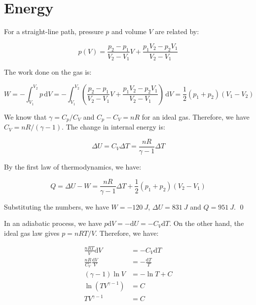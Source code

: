 \documentclass[12pt]{article}
\begin{document}



\pagebreak
\section*{Energy}


For a straight-line path, pressure $p$ and volume $V$ are related by:

\begin{equation}
    p(V) = \frac{p_{2} - p_{1}}{V_{2} - V_{1}} V + \frac{p_{1} V_{2} - p_{2} V_{1}}{V_{2} - V_{1}}
\end{equation}

The work done on the gas is:

\begin{equation}
    W = -\int_{V_{1}}^{V_{2}} p \, \mathrm{d}V = -\int_{V_{1}}^{V_{2}} \left( \frac{p_{2} - p_{1}}{V_{2} - V_{1}} V + \frac{p_{1} V_{2} - p_{2} V_{1}}{V_{2} - V_{1}} \right) \, \mathrm{d}V = \frac{1}{2} (p_{1} + p_{2}) (V_{1} - V_{2})
\end{equation}

We know that $\gamma = C_{p} / C_{V}$ and $C_{p} - C_{V} = nR$ for an ideal gas. Therefore, we have $C_{V} = nR / (\gamma - 1)$. The change in internal energy is:

\begin{equation}
    \Delta U = C_{V} \Delta T = \frac{nR}{\gamma - 1} \Delta T
\end{equation}

By the first law of thermodynamics, we have:

\begin{equation}
    Q = \Delta U - W = \frac{nR}{\gamma - 1} \Delta T + \frac{1}{2} (p_{1} + p_{2}) (V_{2} - V_{1})
\end{equation}

Substituting the numbers, we have $W = \qty{-120}{J}$, $\Delta U = \qty{831}{J}$ and $Q = \qty{951}{J}$.
\qed


In an adiabatic process, we have $p \mathrm{d}V = -\mathrm{d}U = -C_{V} \mathrm{d}T$. On the other hand, the ideal gas law gives $p = nRT/V$. Therefore, we have:

\begin{equation}
\begin{split}
    \frac{nRT}{V} \mathrm{d}V &= -C_{V} \mathrm{d}T \\
    \frac{nR}{C_{V}} \frac{\mathrm{d}V}{V} &= -\frac{\mathrm{d}T}{T} \\
    (\gamma - 1) \ln V &= -\ln T + C \\
    \ln{\left( TV^{\gamma - 1} \right)} &= C \\
    TV^{\gamma - 1} &= C
\end{split}
\end{equation}
\end{document}
